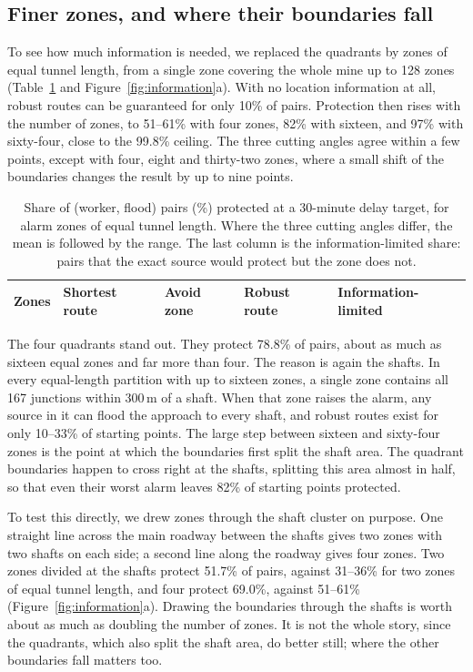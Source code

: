 \documentclass[11pt,a4paper]{article}
\begin{document}
\subsection{Finer zones, and where their boundaries fall}
To see how much information is needed, we replaced the quadrants by zones of equal tunnel length, from a single zone covering the whole mine up to 128 zones (Table~\ref{tab:resolution} and Figure~\ref{fig:information}a). With no location information at all, robust routes can be guaranteed for only 10\% of pairs. Protection then rises with the number of zones, to 51--61\% with four zones, 82\% with sixteen, and 97\% with sixty-four, close to the 99.8\% ceiling. The three cutting angles agree within a few points, except with four, eight and thirty-two zones, where a small shift of the boundaries changes the result by up to nine points.

\begin{table}[htbp]
\centering\small
\caption{Share of (worker, flood) pairs (\%) protected at a 30-minute delay target, for alarm zones of equal tunnel length. Where the three cutting angles differ, the mean is followed by the range. The last column is the information-limited share: pairs that the exact source would protect but the zone does not.}\label{tab:resolution}
\begin{tabular}{@{}lllll@{}}\toprule
Zones & Shortest route & Avoid zone & Robust route & Information-limited\\\midrule

\end{tabular}
\end{table}

The four quadrants stand out. They protect 78.8\% of pairs, about as much as sixteen equal zones and far more than four. The reason is again the shafts. In every equal-length partition with up to sixteen zones, a single zone contains all 167 junctions within 300\,m of a shaft. When that zone raises the alarm, any source in it can flood the approach to every shaft, and robust routes exist for only 10--33\% of starting points. The large step between sixteen and sixty-four zones is the point at which the boundaries first split the shaft area. The quadrant boundaries happen to cross right at the shafts, splitting this area almost in half, so that even their worst alarm leaves 82\% of starting points protected.

To test this directly, we drew zones through the shaft cluster on purpose. One straight line across the main roadway between the shafts gives two zones with two shafts on each side; a second line along the roadway gives four zones. Two zones divided at the shafts protect 51.7\% of pairs, against 31--36\% for two zones of equal tunnel length, and four protect 69.0\%, against 51--61\% (Figure~\ref{fig:information}a). Drawing the boundaries through the shafts is worth about as much as doubling the number of zones. It is not the whole story, since the quadrants, which also split the shaft area, do better still; where the other boundaries fall matters too.
\end{document}
